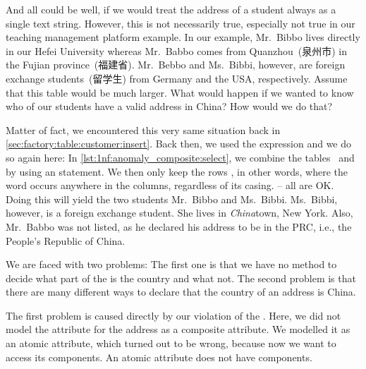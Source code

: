 And all could be well, if we would treat the address of a student always as a single text string.
However, this is not necessarily true, especially not true in our teaching management platform example.
In our example, Mr.~Bibbo lives directly in our Hefei University whereas Mr.~Babbo comes from Quanzhou~(泉州市) in the Fujian province~(福建省).
Mr.~Bebbo and Ms.~Bibbi, however, are foreign exchange students~(留学生) from Germany and the USA, respectively.
Assume that this table would be much larger.
What would happen if we wanted to know who of our students have a valid address in China?
How would we do that?%
%
\begin{sloppypar}%
Matter of fact, we encountered this very same situation back in \cref{sec:factory:table:customer:insert}.
Back then, we used the  expression and we do so again here:
In \cref{lst:1nf:anomaly_composite:select}, we combine the tables~ and  by using an  statement.
We then only keep the rows , in other words, where the word  occurs anywhere in the  columns, regardless of its casing.
    -- all are OK.
Doing this will yield the two students Mr.~Bibbo and Ms.~Bibbi.
Ms.~Bibbi, however, is a foreign exchange student.
She lives in \emph{China}town, New York.
Also, Mr.~Babbo was not listed, as he declared his address to be in the PRC, i.e., the People's Republic of China.%
\end{sloppypar}%
%
We are faced with two problems:
The first one is that we have no method to decide what part of the  is the country and what not.
The second problem is that there are many different ways to declare that the country of an address is China.

The first problem is caused directly by our violation of the .
Here, we did not model the attribute for the address as a composite attribute.
We modelled it as an atomic attribute, which turned out to be wrong, because now we want to access its components.
An atomic attribute does not have components.

